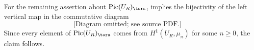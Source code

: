 For the remaining assertion about $\Pic(U_R)_\tors$,  implies the bijectivity of the left vertical map in the commutative diagram
\[
\text{[Diagram omitted; see source PDF.]}
\]
Since every element of $\Pic(U_R)_\tors$ comes from $H^1(U_R, \mu_n)$ for some $n \ge 0$, the claim follows.
\epf




